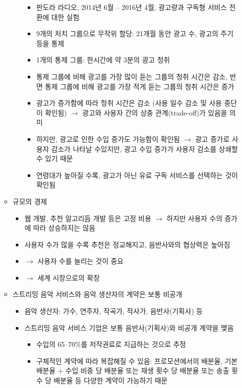 \begin{itemize}
\begin{itemize}
\begin{itemize}
\begin{itemize}
			\item 판도라 라디오, 2014년 6월 -- 2016년 4월, 광고량과 구독형 서비스 전환에 대한 실험 \citep{Huang:2018vq}
			\item 9개의 처치 그룹으로 무작위 할당: 21개월 동안 광고 수, 광고의 주기 등을 통제
			\item 1개의 통제 그룹: 한시간에 약 3분의 광고 청취
			\item 통제 그룹에 비해 광고를 가장 많이 듣는 그룹의 청취 시간은 감소, 반면 통제 그룹에 비해 광고를 가장 적게 듣는 그룹의 청취 시간은 증가
			\item 광고가 증가함에 따라 청취 시간은 감소 (사용 일수 감소 및 사용 중단이 확인됨) $\rightarrow$ 광고와 사용자 간의 상충 관계(trade-off)가 있음을 의미
			\item 하지만, 광고로 인한 수입 증가도 가능함이 확인됨 $\rightarrow$ 광고 증가로 사용자 감소가 나타날 수있지만, 광고 수입 증가가 사용자 감소를 상쇄할 수 있기 때문
			\item 연령대가 높아질 수록, 광고가 아닌 유료 구독 서비스를 선택하는 것이 확인됨
			\end{itemize}
		\end{itemize}
	\item 규모의 경제
		\begin{itemize}
		\item 웹 개발, 추천 알고리듬 개발 등은 고정 비용 $\rightarrow$ 하지만 사용자 수의 증가에 따라 상승하지는 않음
		\item 사용자 수가 많을 수록 추천은 정교해지고, 음반사와의 협상력은 높아짐
		\item $\rightarrow$ 사용자 수를 늘리는 것이 중요
		\item $\rightarrow$ 세계 시장으로의 확장
		\end{itemize}
	\item 스트리밍 음악 서비스와 음악 생산자의 계약은 보통 비공개
		\begin{itemize}
		\item 음악 생산자: 가수, 연주자, 작곡가, 작사가, 음반사(기획사) 등
		\item 스트리밍 음악 서비스 기업은 보통 음반사(기획사)와 비공개 계약을 맺음
			\begin{itemize}
			\item 수입의 65--70\%를 저작권료로 지급하는 것으로 추정
			\item 구체적인 계약에 따라 복잡해질 수 있음: 프로모션에서의 배분율, 기본 배분율 $+$ 수입 비중 당 배분율 또는 재생 횟수 당 배분율 또는 송출 횟수 당 배분율 등 다양한 계약이 가능하기 때문
			\end{itemize}

\end{itemize}
\end{itemize}
\end{itemize}
